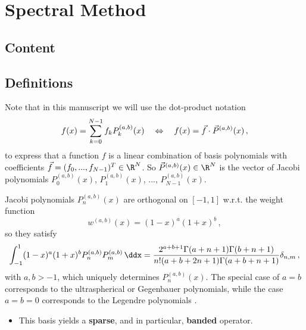 \chapter{Spectral Method}
\label{chap:spectral-method}

\section{Content}


\section{Definitions}












Note that in this manuscript we will use the dot-product notation
$$f(x) = \sum_{k=0}^{N-1} f_k P_k^{(a, b)}(x) \quad\Leftrightarrow\quad f(x) = \vec{f} \cdot \vec{P}^{(a, b)}(x)\,,$$
to express that a function $f$ is a linear combination of basis polynomials with coefficients $\vec{f} = (f_0, ..., f_{N-1})^T \in \R^N$.
So $\vec{P}^{(a, b)}(x) \in \R^N$ is the vector of Jacobi polynomials $P^{(a, b)}_0(x)$, $P^{(a, b)}_1(x)$, ..., $P^{(a, b)}_{N-1}(x)$.

Jacobi polynomials $P_n^{(a,b)}(x)$ are orthogonal on $[-1,1]$ w.r.t. the weight function
\begin{equation*}
  w^{(a,b)}(x)=(1-x)^a (1+x)^b\,,
\end{equation*}
so they satisfy
\begin{align*}\label{eq:orthogonalityconditionJacobi}
  \int_{-1}^1(1-x)^a(1+x)^bP_n^{(a,b)}P_m^{(a,b)}\,\ddx = \frac{2^{a+b+1} \Gamma (a+n+1) \Gamma (b+n+1)}{n! (a+b+2 n+1) \Gamma (a+b+n+1)} \delta_{n,m}\,,
\end{align*}
with $a	,b>-1$, which uniquely determines $P_n^{(a,b)}(x)$. The special case of $a=b$ corresponds to the ultraspherical or Gegenbauer polynomials, while the case $a=b=0$ corresponds to the Legendre polynomials \cite{2018-nist}.

\begin{itemize}
  \item This basis yields a \textbf{sparse}, and in particular, \textbf{banded} operator.
\end{itemize}

